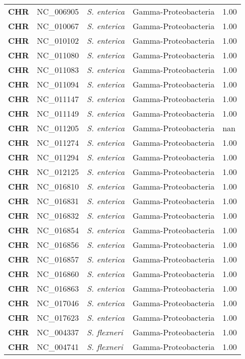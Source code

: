 \begin{adjustwidth}{-3cm}{2cm}
{\begin{supertabular}{>{\bfseries}l|p{0.1\textwidth}p{0.14\textwidth}l|l}
CHR & NC\_006905 & \textit{S. enterica} & Gamma-Proteobacteria & 1.00\\
CHR & NC\_010067 & \textit{S. enterica} & Gamma-Proteobacteria & 1.00\\
CHR & NC\_010102 & \textit{S. enterica} & Gamma-Proteobacteria & 1.00\\
CHR & NC\_011080 & \textit{S. enterica} & Gamma-Proteobacteria & 1.00\\
CHR & NC\_011083 & \textit{S. enterica} & Gamma-Proteobacteria & 1.00\\
CHR & NC\_011094 & \textit{S. enterica} & Gamma-Proteobacteria & 1.00\\
CHR & NC\_011147 & \textit{S. enterica} & Gamma-Proteobacteria & 1.00\\
CHR & NC\_011149 & \textit{S. enterica} & Gamma-Proteobacteria & 1.00\\
CHR & NC\_011205 & \textit{S. enterica} & Gamma-Proteobacteria & nan\\
CHR & NC\_011274 & \textit{S. enterica} & Gamma-Proteobacteria & 1.00\\
CHR & NC\_011294 & \textit{S. enterica} & Gamma-Proteobacteria & 1.00\\
CHR & NC\_012125 & \textit{S. enterica} & Gamma-Proteobacteria & 1.00\\
CHR & NC\_016810 & \textit{S. enterica} & Gamma-Proteobacteria & 1.00\\
CHR & NC\_016831 & \textit{S. enterica} & Gamma-Proteobacteria & 1.00\\
CHR & NC\_016832 & \textit{S. enterica} & Gamma-Proteobacteria & 1.00\\
CHR & NC\_016854 & \textit{S. enterica} & Gamma-Proteobacteria & 1.00\\
CHR & NC\_016856 & \textit{S. enterica} & Gamma-Proteobacteria & 1.00\\
CHR & NC\_016857 & \textit{S. enterica} & Gamma-Proteobacteria & 1.00\\
CHR & NC\_016860 & \textit{S. enterica} & Gamma-Proteobacteria & 1.00\\
CHR & NC\_016863 & \textit{S. enterica} & Gamma-Proteobacteria & 1.00\\
CHR & NC\_017046 & \textit{S. enterica} & Gamma-Proteobacteria & 1.00\\
CHR & NC\_017623 & \textit{S. enterica} & Gamma-Proteobacteria & 1.00\\
CHR & NC\_004337 & \textit{S. flexneri} & Gamma-Proteobacteria & 1.00\\
CHR & NC\_004741 & \textit{S. flexneri} & Gamma-Proteobacteria & 1.00\\

\end{supertabular}}
\end{adjustwidth}
